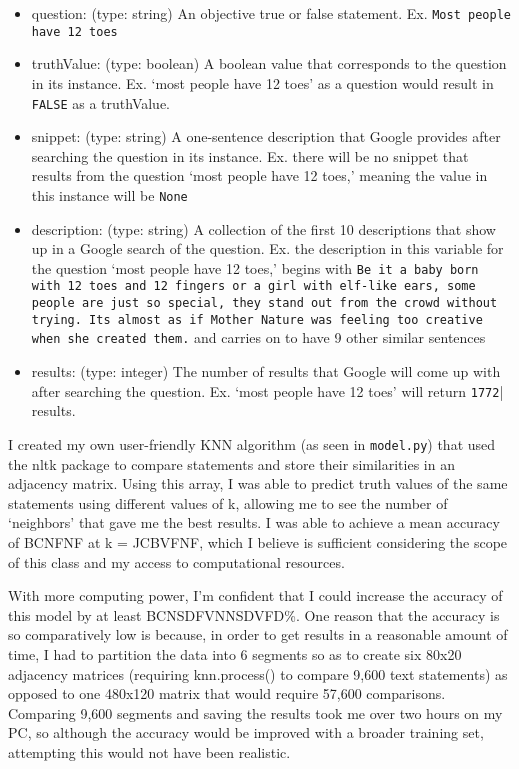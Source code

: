 \documentclass[]{article}
\begin{document}
		\begin{itemize}
			\item question: (type: string) An objective true or false statement. Ex. \texttt{Most people have 12 toes}
				
			\item truthValue: (type: boolean) A boolean value that corresponds to the question in its instance. Ex. `most people have 12 toes' as a question would result in \texttt{FALSE} as a truthValue.
				
			\item snippet: (type: string) A one-sentence description that Google provides after searching the question in its instance. Ex. there will be no snippet that results from the question `most people have 12 toes,' meaning the value in this instance will be \texttt{None}
				
			\item description: (type: string) A collection of the first 10 descriptions that show up in a Google search of the question. Ex. the description in this variable for the question `most people have 12 toes,' begins with \texttt{Be it a baby born with 12 toes and 12 fingers or a girl with elf-like ears, some people are just so special, they stand out from the crowd without trying. Its almost as if Mother Nature was feeling too creative when she created them.} and carries on to have 9 other similar sentences
				
			\item results: (type: integer) The number of results that Google will come up with after searching the question. Ex. `most people have 12 toes' will return \texttt{1772}| results.
		\end{itemize}
		
		I created my own user-friendly KNN algorithm (as seen in \texttt{model.py}) that used the nltk package to compare statements and store their similarities in an adjacency matrix. Using this array, I was able to predict truth values of the same statements using different values of k, allowing me to see the number of `neighbors' that gave me the best results.
		I was able to achieve a mean accuracy of BCNFNF at k = JCBVFNF, which I believe is sufficient considering the scope of this class and my access to computational resources. 
		
		With more computing power, I'm confident that I could increase the accuracy of this model by at least BCNSDFVNNSDVFD\%. One reason that the accuracy is so comparatively low is because, in order to get results in a reasonable amount of time, I had to partition the data into 6 segments so as to create six 80x20 adjacency matrices (requiring knn.process() to compare 9,600 text statements) as opposed to one 480x120 matrix that would require 57,600 comparisons. Comparing 9,600 segments and saving the results took me over two hours on my PC, so although the accuracy would be improved with a broader training set, attempting this would not have been realistic.
		
\end{document}
